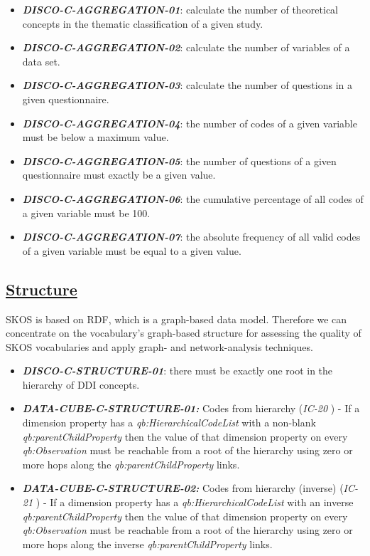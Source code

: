 \documentclass{llncs}
\begin{document}
\begin{itemize}
	\item \textbf{{\em DISCO-C-AGGREGATION-01}}: calculate the number of theoretical concepts in the thematic classification of a given study.
  \item \textbf{{\em DISCO-C-AGGREGATION-02}}: calculate the number of variables of a data set.
	\item \textbf{{\em DISCO-C-AGGREGATION-03}}: calculate the number of questions in a given questionnaire.
	\item \textbf{{\em DISCO-C-AGGREGATION-04}}: the number of codes of a given variable must be below a maximum value.
	\item \textbf{{\em DISCO-C-AGGREGATION-05}}: the number of questions of a given questionnaire must exactly be a given value.
	\item \textbf{{\em DISCO-C-AGGREGATION-06}}: the cumulative percentage of all codes of a given variable must be 100.
  \item \textbf{{\em DISCO-C-AGGREGATION-07}}: the absolute frequency of all valid codes of a given variable must be equal to a given value.
\end{itemize} 

\subsection{\underline{Structure}}

SKOS is based on RDF, which is a graph-based data model. Therefore we can concentrate on the vocabulary's graph-based structure for assessing the quality of SKOS vocabularies and apply graph- and network-analysis techniques. 

\begin{itemize}
	\item \textbf{{\em DISCO-C-STRUCTURE-01}}: there must be exactly one root in the hierarchy of DDI concepts. 
\end{itemize} 

\begin{itemize}
	\item \textbf{{\em DATA-CUBE-C-STRUCTURE-01:}}
	Codes from hierarchy (\emph{IC-20} \cite{CyganiakReynolds2014}) -  
	If a dimension property has a \emph{qb:HierarchicalCodeList} with a non-blank \emph{qb:parentChildProperty} then the value of that dimension property on every \emph{qb:Observation} must be reachable from a root of the hierarchy using zero or more hops along the \emph{qb:parentChildProperty} links. 
	\item \textbf{{\em DATA-CUBE-C-STRUCTURE-02:}}
	Codes from hierarchy (inverse) (\emph{IC-21} \cite{CyganiakReynolds2014}) -  
	If a dimension property has a \emph{qb:HierarchicalCodeList} with an inverse \emph{qb:parentChildProperty} then the value of that dimension property on every \emph{qb:Observation} must be reachable from a root of the hierarchy using zero or more hops along the inverse \emph{qb:parentChildProperty} links. 
\end{itemize}
\end{document}
